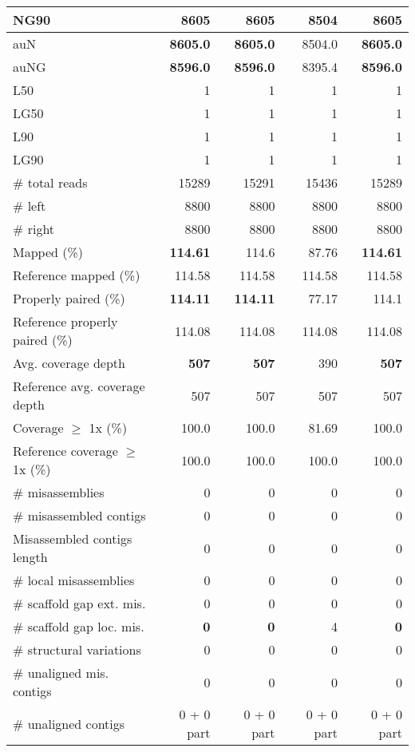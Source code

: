 \documentclass[12pt,a4paper]{article}
\begin{document}
\begin{table}[ht]
\begin{center}
\begin{tabular}{|l*{4}{|r}|}
NG90 & {\bf 8605} & {\bf 8605} & 8504 & {\bf 8605} \\ \hline
auN & {\bf 8605.0} & {\bf 8605.0} & 8504.0 & {\bf 8605.0} \\ \hline
auNG & {\bf 8596.0} & {\bf 8596.0} & 8395.4 & {\bf 8596.0} \\ \hline
L50 & 1 & 1 & 1 & 1 \\ \hline
LG50 & 1 & 1 & 1 & 1 \\ \hline
L90 & 1 & 1 & 1 & 1 \\ \hline
LG90 & 1 & 1 & 1 & 1 \\ \hline
\# total reads & 15289 & 15291 & 15436 & 15289 \\ \hline
\# left & 8800 & 8800 & 8800 & 8800 \\ \hline
\# right & 8800 & 8800 & 8800 & 8800 \\ \hline
Mapped (\%) & {\bf 114.61} & 114.6 & 87.76 & {\bf 114.61} \\ \hline
Reference mapped (\%) & 114.58 & 114.58 & 114.58 & 114.58 \\ \hline
Properly paired (\%) & {\bf 114.11} & {\bf 114.11} & 77.17 & 114.1 \\ \hline
Reference properly paired (\%) & 114.08 & 114.08 & 114.08 & 114.08 \\ \hline
Avg. coverage depth & {\bf 507} & {\bf 507} & 390 & {\bf 507} \\ \hline
Reference avg. coverage depth & 507 & 507 & 507 & 507 \\ \hline
Coverage $\geq$ 1x (\%) & 100.0 & 100.0 & 81.69 & 100.0 \\ \hline
Reference coverage $\geq$ 1x (\%) & 100.0 & 100.0 & 100.0 & 100.0 \\ \hline
\# misassemblies & 0 & 0 & 0 & 0 \\ \hline
\# misassembled contigs & 0 & 0 & 0 & 0 \\ \hline
Misassembled contigs length & 0 & 0 & 0 & 0 \\ \hline
\# local misassemblies & 0 & 0 & 0 & 0 \\ \hline
\# scaffold gap ext. mis. & 0 & 0 & 0 & 0 \\ \hline
\# scaffold gap loc. mis. & {\bf 0} & {\bf 0} & 4 & {\bf 0} \\ \hline
\# structural variations & 0 & 0 & 0 & 0 \\ \hline
\# unaligned mis. contigs & 0 & 0 & 0 & 0 \\ \hline
\# unaligned contigs & 0 + 0 part & 0 + 0 part & 0 + 0 part & 0 + 0 part \\ \hline

\end{tabular}
\end{center}
\end{table}
\end{document}
